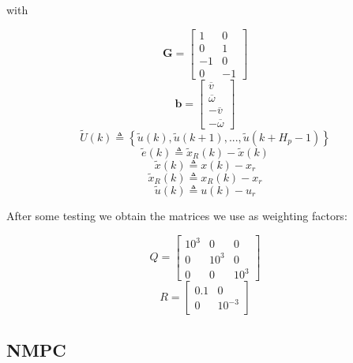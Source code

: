 \documentclass[conference]{IEEEtran}
\begin{document}
with

\begin{equation*}
\mathbf{G} = \left[\begin{array}{cc} 1 & 0\\
0 & 1 \\
-1 & 0\\
0 & -1 \end{array}\right]
\end{equation*}
\begin{equation*}
\mathbf{b} = \left[\begin{array}{c} \overline{v} \\
\overline{\omega} \\
-\overline{v}\\
-\overline{\omega} \end{array}\right]
\end{equation*}
\begin{equation*}
\tilde{U}(k) \triangleq \left\lbrace \tilde{u}(k),\tilde{u}(k+1),...,\tilde{u}(k+H_{p}-1)\right\rbrace
\end{equation*}
\begin{equation*}
\tilde{e}(k) \triangleq \tilde{x}_{R}(k)-\tilde{x}(k)
\end{equation*}
\begin{equation*}
\tilde{x}(k) \triangleq x(k)-x_{r}
\end{equation*}
\begin{equation*}
\tilde{x}_{R}(k) \triangleq x_{R}(k)-x_{r}
\end{equation*}
\begin{equation*}
\tilde{u}(k) \triangleq u(k)-u_{r}
\end{equation*}

After some testing we obtain the matrices we use as weighting factors:

\begin{equation*}
Q = \left[\begin{array}{ccc} 10^3 & 0 & 0 \\
0 & 10^3 & 0 \\
0 & 0 & 10^3 \end{array} \right]
\end{equation*}
\begin{equation*}
R = \left[\begin{array}{cc} 0.1 & 0 \\
0 & 10^{-3} \end{array} \right]
\end{equation*}


\subsection{NMPC}\label{BB}
\end{document}
